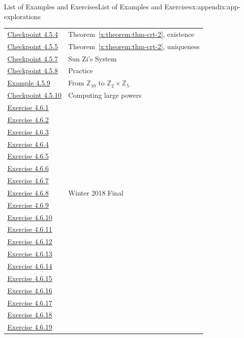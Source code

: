\documentclass[oneside,10pt,]{book}
\newcommand{\xreffont}{\relax}
\numberwithin{equation}{section}
\begin{document}
\begin{appendixptx}{List of Examples and Exercises}{}{List of Examples and Exercises}{}{}{x:appendix:app-explorations}
\begin{longtable}[l]{ll}
\hyperref[x:exercise:ex-crt-2-prove-existence]{Checkpoint 4.5.4}& Theorem~{\xreffont\ref*{x:theorem:thm-crt-2}}, existence\\
\hyperref[x:exercise:ex-crt-2-prove-uniqueness]{Checkpoint 4.5.5}& Theorem~{\xreffont\ref*{x:theorem:thm-crt-2}}, uniqueness\\
\hyperref[x:exercise:ex-crt-sun-zi]{Checkpoint 4.5.7}& Sun Zi's System\\
\hyperref[x:exercise:ex-crt-n]{Checkpoint 4.5.8}& Practice\\
\hyperref[x:example:eg-crt-bijection]{Example 4.5.9}& From \(\mathbb{Z}_{10}\) to \(\mathbb{Z}_2 \times \mathbb{Z}_5\)\\
\hyperref[x:exercise:ex-crt-bijection-power]{Checkpoint 4.5.10}& Computing large powers\\
\hyperlink{g:exercise:id539040}{Exercise 4.6.1}& \\
\hyperlink{g:exercise:id539012}{Exercise 4.6.2}& \\
\hyperlink{g:exercise:id539048}{Exercise 4.6.3}& \\
\hyperlink{g:exercise:id539078}{Exercise 4.6.4}& \\
\hyperlink{g:exercise:id539102}{Exercise 4.6.5}& \\
\hyperlink{g:exercise:id539149}{Exercise 4.6.6}& \\
\hyperlink{g:exercise:id539173}{Exercise 4.6.7}& \\
\hyperlink{g:exercise:id539168}{Exercise 4.6.8}& Winter 2018 Final\\
\hyperlink{g:exercise:id539167}{Exercise 4.6.9}& \\
\hyperlink{g:exercise:id539205}{Exercise 4.6.10}& \\
\hyperlink{g:exercise:id539269}{Exercise 4.6.11}& \\
\hyperlink{g:exercise:id539245}{Exercise 4.6.12}& \\
\hyperlink{g:exercise:id539301}{Exercise 4.6.13}& \\
\hyperlink{x:exercise:ex-cong-power-two}{Exercise 4.6.14}& \\
\hyperlink{g:exercise:id539329}{Exercise 4.6.15}& \\
\hyperlink{x:exercise:ex-cong-phi-prime-power-prod}{Exercise 4.6.16}& \\
\hyperlink{x:exercise:ex-cong-phi-multiplicative}{Exercise 4.6.17}& \\
\hyperlink{g:exercise:id539449}{Exercise 4.6.18}& \\
\hyperlink{g:exercise:id539438}{Exercise 4.6.19}& \\

\end{longtable}
\end{appendixptx}
\end{document}
